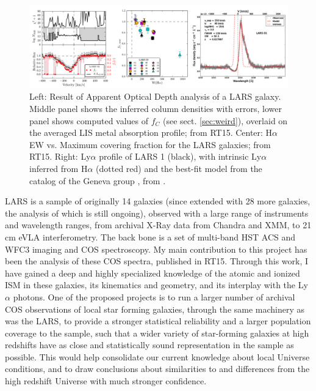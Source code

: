 \documentclass[12pt]{amsart}
\begin{document}
\begin{figure}[htbp] %
   \centering
   \includegraphics[width=\textwidth]{LarsResults.png} 
   \caption{Left: Result of Apparent Optical Depth analysis of a LARS galaxy.
   Middle panel shows the inferred column densities with errors, lower panel
   shows computed values of $f_C$ (see sect. \ref{sec:weird}), overlaid on the
   averaged LIS metal absorption profile; from RT15. Center: H$\alpha$ EW vs.
   Maximum covering fraction for the LARS galaxies; from RT15. Right: Ly$\alpha$
   profile of LARS 1 (black), with intrinsic Ly$\alpha$ inferred from H$\alpha$
   (dotted red) and the best-fit model from the catalog of the Geneva group
   \citep{Schaerer2011}, from \cite{LARSI}.}
   \label{fig:LARS}
\end{figure}

LARS is a sample of originally 14 galaxies (since extended with 28 more
galaxies, the analysis of which is still ongoing), observed with a large range
of instruments and wavelength ranges, from archival X-Ray data from Chandra and
XMM, to 21 cm eVLA interferometry. The back bone is a set of multi-band HST ACS
and WFC3 imaging and COS spectroscopy. My main contribution to this project has
been the analysis of these COS spectra, published in RT15. Through this work, I
have gained a deep and highly specialized knowledge of the atomic and ionized
ISM in these galaxies, its kinematics and geometry, and its interplay with the
Ly$\alpha$ photons. One of the proposed projects is to run a larger number of
archival COS observations of local star forming galaxies, through the same
machinery as was the LARS, to provide a stronger statistical reliability and a
larger population coverage to the sample, such that a wider variety of
star-forming galaxies at high redshifts have as close and statistically sound
representation in the sample as possible. This would help consolidate our
current knowledge about local Universe conditions, and to draw conclusions about
similarities to and differences from the high redshift Universe with much
stronger confidence.
\end{document}
